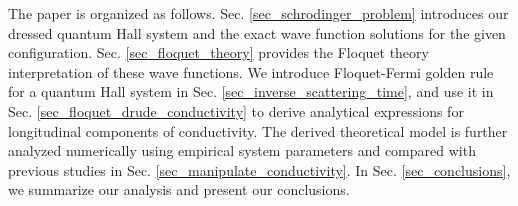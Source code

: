 The paper is organized as follows. Sec.  \ref{sec_schrodinger_problem} introduces our dressed quantum Hall system and the exact wave function solutions for the given configuration. Sec. \ref{sec_floquet_theory} provides the Floquet theory interpretation of these wave functions.
We introduce Floquet-Fermi golden rule for a quantum Hall system in Sec. \ref{sec_inverse_scattering_time}, and use it in Sec. \ref{sec_floquet_drude_conductivity} to derive analytical expressions for longitudinal components of conductivity.
The derived theoretical model is further analyzed numerically using empirical system parameters and compared with previous studies in Sec. \ref{sec_manipulate_conductivity}.
In Sec. \ref{sec_conclusions}, we summarize our analysis and present our conclusions.
